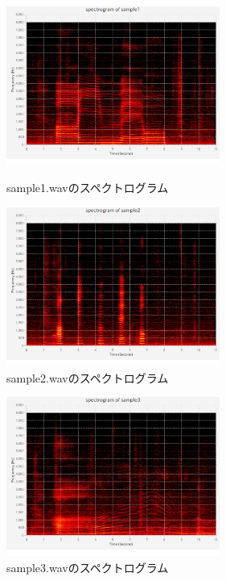 \documentclass[a4j]{jarticle}
\begin{document}
\begin{figure}[htbp]
 \begin{minipage}{0.5\hsize}
  \begin{center}
   \includegraphics[width=70mm]{spec1.eps}
  \end{center}
  \caption{sample1.wavのスペクトログラム}
  \label{fig:one}
 \end{minipage}
 \begin{minipage}{0.5\hsize}
  \begin{center}
   \includegraphics[width=70mm]{spec2.eps}
  \end{center}
  \caption{sample2.wavのスペクトログラム}
  \label{fig:two}
 \end{minipage}
\end{figure}

\begin{figure}[htbp]
 \begin{minipage}{0.5\hsize}
  \begin{center}
   \includegraphics[width=70mm]{spec3.eps}
  \end{center}
  \caption{sample3.wavのスペクトログラム}
  \label{fig:one}
 \end{minipage}
\end{figure}
\end{document}
